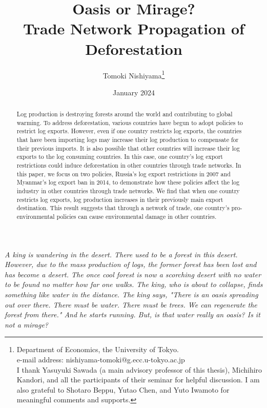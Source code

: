\documentclass[a4paper,12pt]{article}
\begin{document}
\title{Oasis or Mirage? \\ Trade Network Propagation of Deforestation}
\author{Tomoki Nishiyama\footnote{Department of Economics, the University of Tokyo. \\ e-mail address: nishiyama-tomoki@g.ecc.u-tokyo.ac.jp \\ I thank Yasuyuki Sawada (a main advisory professor of this thesis), Michihiro Kandori, and all the participants of their seminar for helpful discussion. I am also grateful to Shotaro Beppu, Yutao Chen, and Yuto Iwamoto for meaningful comments and supports.}}
\date{January 2024}
\maketitle

\begin{abstract}
    Log production is destroying forests around the world and contributing to global warming. To address deforestation, various countries have begun to adopt policies to restrict log exports. However, even if one country restricts log exports, the countries that have been importing logs may increase their log production to compensate for their previous imports. It is also possible that other countries will increase their log exports to the log consuming countries. In this case, one country's log export restrictions could induce deforestation in other countries through trade networks. In this paper, we focus on two policies, Russia's log export restrictions in 2007 and Myanmar's log export ban in 2014, to demonstrate how these policies affect the log industry in other countries through trade networks. We find that when one country restricts log exports, log production increases in their previously main export destination. This result suggests that through a network of trade, one country's pro-environmental policies can cause environmental damage in other countries.
\end{abstract}

\textit{
    A king is wandering in the desert. There used to be a forest in this desert. However, due to the mass production of logs, the former forest has been lost and has become a desert. The once cool forest is now a scorching desert with no water to be found no matter how far one walks. The king, who is about to collapse, finds something like water in the distance. The king says, "There is an oasis spreading out over there. There must be water. There must be trees. We can regenerate the forest from there." And he starts running. But, is that water really an oasis? Is it not a mirage?
}
\end{document}

